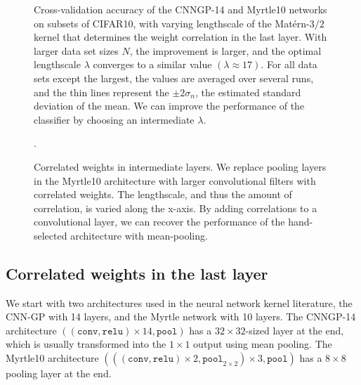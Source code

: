 \documentclass[tablecaption=bottom,wcp,nonatbib]{jmlr} %
\begin{document}

\begin{figure}[htpb]
 \scalebox{1.0}{}
  \caption{Cross-validation accuracy of the CNNGP-14 and Myrtle10 networks on subsets of CIFAR10, with varying lengthscale of the Matérn-$3/2$ kernel that determines the weight correlation in the last layer. With larger data set sizes $N$, the improvement is larger, and the optimal lengthscale $\lambda$ converges to a similar value $(\lambda \approx 17)$. For all data sets except the largest, the values are averaged over several runs, and the thin lines represent the $\pm 2\sigma_n$, the estimated standard deviation of the mean. We can improve the performance of the classifier by choosing an intermediate $\lambda$. \label{ref:fig-last-layer}}
\end{figure}

\begin{figure}[htpb]
  \scalebox{1.0}{}.
  \caption{Correlated weights in intermediate layers. We replace pooling layers in the Myrtle10 architecture with larger convolutional filters with correlated weights. The lengthscale, and thus the amount of correlation, is varied along the x-axis. By adding correlations to a convolutional layer, we can recover the performance of the hand-selected architecture with mean-pooling. \label{ref:fig-all-layers}}
\end{figure}


\subsection{Correlated weights in the last layer}

We start with two architectures used in the neural network kernel literature, the CNN-GP \citep{novak2019infiniteconv,arora2019exact} with 14 layers, and the Myrtle network \citep{shankar2020without} with 10 layers. The CNNGP-14 architecture $((\texttt{conv}, \texttt{relu})\times 14, \texttt{pool})$ has a $32 \times 32$-sized layer at the end, which is usually transformed into the $1 \times 1$ output using mean pooling. The Myrtle10 architecture $(((\texttt{conv},\texttt{relu})\times 2, \texttt{pool}_{2\times 2}) \times 3, \texttt{pool})$ has a $8\times 8$ pooling layer at the end.
\end{document}
